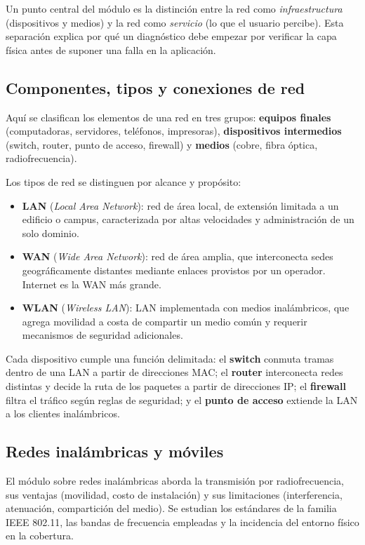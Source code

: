 \documentclass[11pt,a4paper]{article}
\begin{document}
Un punto central del módulo es la distinción entre la red como
\emph{infraestructura} (dispositivos y medios) y la red como
\emph{servicio} (lo que el usuario percibe). Esta separación explica por qué
un diagnóstico debe empezar por verificar la capa física antes de suponer una
falla en la aplicación.

\subsection{Componentes, tipos y conexiones de red}

Aquí se clasifican los elementos de una red en tres grupos: \textbf{equipos
finales} (computadoras, servidores, teléfonos, impresoras), \textbf{dispositivos
intermedios} (switch, router, punto de acceso, firewall) y \textbf{medios}
(cobre, fibra óptica, radiofrecuencia).

Los tipos de red se distinguen por alcance y propósito:

\begin{itemize}[leftmargin=*]
  \item \textbf{LAN} (\textit{Local Area Network}): red de área local, de
        extensión limitada a un edificio o campus, caracterizada por altas
        velocidades y administración de un solo dominio.
  \item \textbf{WAN} (\textit{Wide Area Network}): red de área amplia, que
        interconecta sedes geográficamente distantes mediante enlaces
        provistos por un operador. Internet es la WAN más grande.
  \item \textbf{WLAN} (\textit{Wireless LAN}): LAN implementada con medios
        inalámbricos, que agrega movilidad a costa de compartir un medio
        común y requerir mecanismos de seguridad adicionales.
\end{itemize}

Cada dispositivo cumple una función delimitada: el \textbf{switch} conmuta
tramas dentro de una LAN a partir de direcciones MAC; el \textbf{router}
interconecta redes distintas y decide la ruta de los paquetes a partir de
direcciones IP; el \textbf{firewall} filtra el tráfico según reglas de
seguridad; y el \textbf{punto de acceso} extiende la LAN a los clientes
inalámbricos.

\subsection{Redes inalámbricas y móviles}

El módulo sobre redes inalámbricas aborda la transmisión por radiofrecuencia,
sus ventajas (movilidad, costo de instalación) y sus limitaciones
(interferencia, atenuación, compartición del medio). Se estudian los
estándares de la familia IEEE 802.11, las bandas de frecuencia empleadas y la
incidencia del entorno físico en la cobertura.
\end{document}
